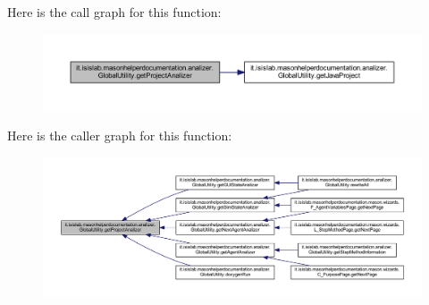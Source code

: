 Here is the call graph for this function\-:
\nopagebreak
\begin{figure}[H]
\begin{center}
\leavevmode
\includegraphics[width=350pt]{classit_1_1isislab_1_1masonhelperdocumentation_1_1analizer_1_1_global_utility_af6bcca0c06ec6fa8c2b2b88f5050914c_cgraph}
\end{center}
\end{figure}




Here is the caller graph for this function\-:
\nopagebreak
\begin{figure}[H]
\begin{center}
\leavevmode
\includegraphics[width=350pt]{classit_1_1isislab_1_1masonhelperdocumentation_1_1analizer_1_1_global_utility_af6bcca0c06ec6fa8c2b2b88f5050914c_icgraph}
\end{center}
\end{figure}


